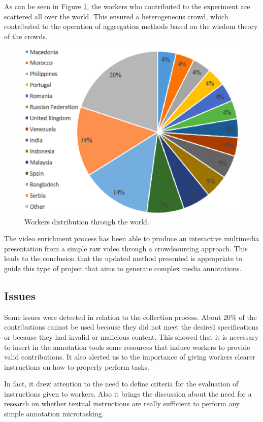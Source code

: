 As can be seen in Figure \ref{workers}, the workers who contributed to the experiment are scattered all over the world. This ensured a heterogeneous crowd, which contributed to the operation of aggregation methods based on the wisdom theory of the crowds.
\begin{figure}[h]
	\centerline{\includegraphics[scale=0.4] {figure/workers_2}}
	\caption{Workers distribution through the world.}
	\label{workers}
\end{figure}

The video enrichment process has been able to produce an interactive multimedia presentation from a simple raw video through a crowdsourcing approach. This leads to the conclusion that the updated method presented is appropriate to guide this type of project that aims to generate complex media annotations.

\subsection{Issues}
Some issues were detected in relation to the collection process. About 20\% of the contributions cannot be used because they did not meet the desired specifications or because they had invalid or malicious content. This showed that it is necessary to insert in the annotation tools some resources that induce workers to provide valid contributions. It also alerted us to the importance of giving workers clearer instructions on how to properly perform tasks.

In fact, it drew attention to the need to define criteria for the evaluation of instructions given to workers. Also it brings the discussion about the need for a research on whether textual instructions are really sufficient to perform any simple annotation microtasking.

